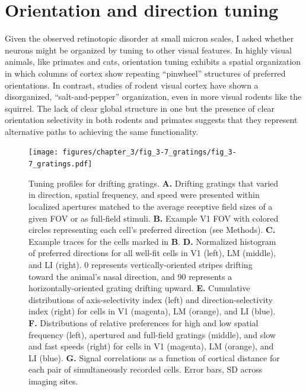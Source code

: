 \section{Orientation and direction tuning}
Given the observed retinotopic disorder at small micron scales, I asked whether neurons might be organized by tuning to other visual features. In highly visual animals, like primates and cats, orientation tuning exhibits a spatial organization in which columns of cortex show repeating ``pinwheel'' structures of preferred orientations. In contrast, studies of rodent visual cortex have shown a disorganized, ``salt-and-pepper'' organization\cite{Ohki2005}, even in more visual rodents like the squirrel\cite{VanHooser2005}. The lack of clear global structure in one but the presence of clear orientation selectivity in both rodents and primates suggests that they represent alternative paths to achieving the same functionality.

\begin{figure}[t!]
    \texttt{[image: figures/chapter\_3/fig\_3-7\_gratings/fig\_3-7\_gratings.pdf]}
    \vspace{.1in}
    \caption[Responses to drifting gratings]{Tuning profiles for drifting gratings.
    \textbf{A.} Drifting gratings that varied in direction, spatial frequency, and speed were presented within localized apertures matched to the average receptive field sizes of a given FOV or as full-field stimuli.
    \textbf{B.} Example V1 FOV with colored circles representing each cell's preferred direction (see Methods).
    \textbf{C.} Example traces for the cells marked in \textbf{B}. 
    \textbf{D.} Normalized histogram of preferred directions for all well-fit cells in V1 (left), LM (middle), and LI (right). 0 represents vertically-oriented stripes drifting toward the animal's nasal direction, and 90 represents a horizontally-oriented grating drifting upward.
    \textbf{E.} Cumulative distributions of axis-selectivity index (left) and direction-selectivity index (right) for cells in V1 (magenta), LM (orange), and LI (blue).
    \textbf{F.} Distributions of relative preferences for high and low spatial frequency (left), apertured and full-field gratings (middle), and slow and fast speeds (right) for cells in V1 (magenta), LM (orange), and LI (blue).
    \textbf{G.} Signal correlations as a function of cortical distance for each pair of simultaneously recorded cells. Error bars, SD across imaging sites.  
    \label{fig:gratings}}
\end{figure}

